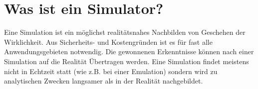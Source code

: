 ﻿\section{Was ist ein Simulator?}

Eine Simulation ist ein m\"oglichst realit\"atsnahes Nachbilden von Geschehen der Wirklichkeit. Aus Sicherheits- und Kostengr\"unden ist es f\"ur fast alle Anwendungsgebieten notwendig. Die gewonnenen Erkenntnisse k\"onnen nach einer Simulation auf die Realit\"at \"Ubertragen werden. Eine Simulation findet meistens nicht in Echtzeit statt (wie z.B. bei einer Emulation) sondern wird zu analytischen Zwecken langsamer als in der Realit\"at nachgebildet.
